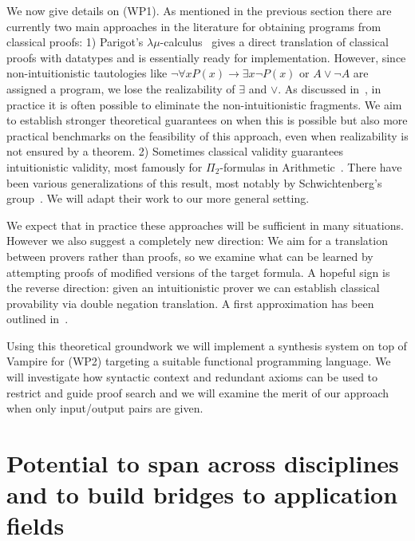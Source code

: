 \documentclass[a4paper,12pt]{article}
\begin{document}
		
	We now give details on (WP1). As mentioned in the previous section there are currently two main approaches in the literature for obtaining programs from classical proofs: 1) Parigot's $\lambda\mu$-calculus~\cite{Parigot1} gives a direct translation of classical proofs with datatypes and is essentially ready for implementation. However, since non-intuitionistic tautologies like $\neg\forall xP(x)\to \exists x\neg P(x)$ or $A\vee \neg A$ are assigned a program, we lose the realizability of $\exists$ and $\vee$. As discussed in~\cite{practical}, in practice it is often possible to eliminate the non-intuitionistic fragments. We aim to establish stronger theoretical guarantees on when this is possible but also more practical benchmarks on the feasibility of this approach, even when realizability is not ensured by a theorem. 2) Sometimes classical validity guarantees intuitionistic validity, most famously for $\Pi_2$-formulas in Arithmetic~\cite{Friedman}. There have been various generalizations of this result, most notably by Schwichtenberg's group~\cite{schwichtenberg}. We will adapt their work to our more general setting.
	
	We expect that in practice these approaches will be sufficient in many situations. However we also suggest a completely new direction: We aim for a translation between provers rather than proofs, so we examine what can be learned by attempting proofs of modified versions of the target formula. A hopeful sign is the reverse direction: given an intuitionistic prover we can establish classical provability via double negation translation. A first approximation has been outlined in~\cite{RDNT}.
	
	Using this theoretical groundwork we will implement a synthesis system on top of Vampire for (WP2) targeting a suitable functional programming language. We will investigate how syntactic context and redundant
	axioms can be used to restrict and guide proof search and we will examine the merit of our approach when only input/output pairs are given.
	
	
	\section{Potential to span across disciplines and to build bridges to application fields}
	
	
	
	
\end{document}
